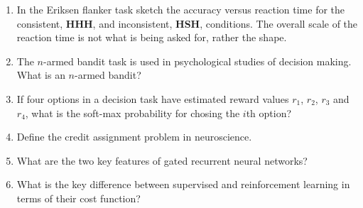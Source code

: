 \documentclass{article}
\newif\ifanswer
\begin{document}
\begin{enumerate}
\item In the Eriksen flanker task sketch the accuracy versus
reaction time for the consistent, \textbf{HHH}, and inconsistent,
\textbf{HSH}, conditions. The overall scale of the reaction time is
not what is being asked for, rather the shape.

\ifanswer \textbf{Answer}:\\
In both cases the line starts at 0.5 but in the consistent case it
rises quickly to one, in the inconsistent case it falls below 0.5
before rising more slowly to one. [1 mark for starting at 0.5 and rising to 1, the other for the dip in inconsistent].
\fi

\item The $n$-armed bandit task is used in psychological studies of decision making. What is an $n$-armed bandit?

  \ifanswer \textbf{Answer}:\\
  In an $n$-armed bandit the participant has to chose between $n$ options, typically $n$ buttons, each with a different probability of reward.
  \fi

\item If four options in a decision task have estimated reward values $r_1$, $r_2$, $r_3$ and $r_4$, what is the soft-max probability for chosing the $i$th option?

  \ifanswer \textbf{Answer}:\\
  \begin{equation}
    p_i=\frac{e^{\beta r_i}}{\sum_j e^{\beta r_j}}
  \end{equation}
  for some $\beta$, a parameter determining the exploration to exploitation balance.
  \fi


\item Define the credit assignment problem in neuroscience.

  \ifanswer \textbf{Answer}: The credit assignment is the problem of deciding how to change parameters in the brain (typically synaptic weights) to best improve behaviour (e.g. a desired motor output).
  \fi
  
\item What are the two key features of gated recurrent neural networks?

  \ifanswer \textbf{Answer}: Gated RNNs have two defining features, the memory cell and the gating units.\\
  \fi
  
\item What is the key difference between supervised and reinforcement learning in terms of their cost function?


\end{enumerate}
\end{document}
